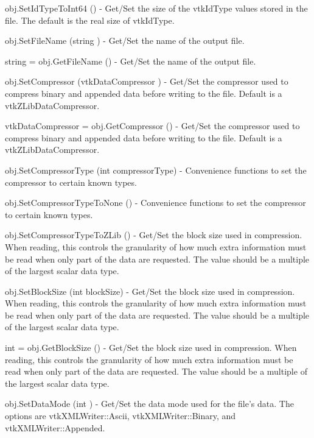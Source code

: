 \begin{DoxyItemize}
\item {\ttfamily obj.\-Set\-Id\-Type\-To\-Int64 ()} -\/ Get/\-Set the size of the vtk\-Id\-Type values stored in the file. The default is the real size of vtk\-Id\-Type.  
\item {\ttfamily obj.\-Set\-File\-Name (string )} -\/ Get/\-Set the name of the output file.  
\item {\ttfamily string = obj.\-Get\-File\-Name ()} -\/ Get/\-Set the name of the output file.  
\item {\ttfamily obj.\-Set\-Compressor (vtk\-Data\-Compressor )} -\/ Get/\-Set the compressor used to compress binary and appended data before writing to the file. Default is a vtk\-Z\-Lib\-Data\-Compressor.  
\item {\ttfamily vtk\-Data\-Compressor = obj.\-Get\-Compressor ()} -\/ Get/\-Set the compressor used to compress binary and appended data before writing to the file. Default is a vtk\-Z\-Lib\-Data\-Compressor.  
\item {\ttfamily obj.\-Set\-Compressor\-Type (int compressor\-Type)} -\/ Convenience functions to set the compressor to certain known types.  
\item {\ttfamily obj.\-Set\-Compressor\-Type\-To\-None ()} -\/ Convenience functions to set the compressor to certain known types.  
\item {\ttfamily obj.\-Set\-Compressor\-Type\-To\-Z\-Lib ()} -\/ Get/\-Set the block size used in compression. When reading, this controls the granularity of how much extra information must be read when only part of the data are requested. The value should be a multiple of the largest scalar data type.  
\item {\ttfamily obj.\-Set\-Block\-Size (int block\-Size)} -\/ Get/\-Set the block size used in compression. When reading, this controls the granularity of how much extra information must be read when only part of the data are requested. The value should be a multiple of the largest scalar data type.  
\item {\ttfamily int = obj.\-Get\-Block\-Size ()} -\/ Get/\-Set the block size used in compression. When reading, this controls the granularity of how much extra information must be read when only part of the data are requested. The value should be a multiple of the largest scalar data type.  
\item {\ttfamily obj.\-Set\-Data\-Mode (int )} -\/ Get/\-Set the data mode used for the file's data. The options are vtk\-X\-M\-L\-Writer\-::\-Ascii, vtk\-X\-M\-L\-Writer\-::\-Binary, and vtk\-X\-M\-L\-Writer\-::\-Appended.  

\end{DoxyItemize}
